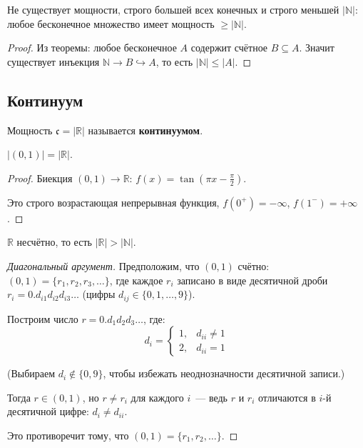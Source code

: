 \documentclass[12pt]{article}
\begin{document}
	\begin{corollary}
		Не существует мощности, строго большей всех конечных и строго меньшей $|\mathbb{N}|$: любое бесконечное множество имеет мощность $\geqslant |\mathbb{N}|$.
	\end{corollary}
	
	\begin{proof}
		Из теоремы: любое бесконечное $A$ содержит счётное $B \subseteq A$. Значит существует инъекция $\mathbb{N} \to B \hookrightarrow A$, то есть $|\mathbb{N}| \leqslant |A|$.
	\end{proof}
	
	\subsection{Континуум}
	
	\begin{definition}
		Мощность $\mathfrak{c} = |\mathbb{R}|$ называется \textbf{континуумом}.
	\end{definition}
	
	\begin{theorem}
		$|(0, 1)| = |\mathbb{R}|$.
	\end{theorem}
	
	\begin{proof}
		Биекция $(0, 1) \to \mathbb{R}$: $f(x) = \tan\!\left(\pi x - \frac{\pi}{2}\right)$.
		
		Это строго возрастающая непрерывная функция, $f(0^+) = -\infty$, $f(1^-) = +\infty$.
	\end{proof}
	
	\begin{theorem}[Кантор]
		$\mathbb{R}$ несчётно, то есть $|\mathbb{R}| > |\mathbb{N}|$.
	\end{theorem}
	
	\begin{proof}[Диагональный аргумент]
		Предположим, что $(0, 1)$ счётно: $(0, 1) = \{r_1, r_2, r_3, \dots\}$, где каждое $r_i$ записано в виде десятичной дроби $r_i = 0.d_{i1}d_{i2}d_{i3}\dots$ (цифры $d_{ij} \in \{0, 1, \dots, 9\}$).
		
		Построим число $r = 0.d_1d_2d_3\dots$, где:
		\[d_i = \begin{cases} 1, & d_{ii} \neq 1 \\ 2, & d_{ii} = 1 \end{cases}\]
		
		(Выбираем $d_i \notin \{0, 9\}$, чтобы избежать неоднозначности десятичной записи.)
		
		Тогда $r \in (0, 1)$, но $r \neq r_i$ для каждого $i$~--- ведь $r$ и $r_i$ отличаются в $i$-й десятичной цифре: $d_i \neq d_{ii}$.
		
		Это противоречит тому, что $(0, 1) = \{r_1, r_2, \dots\}$.
	\end{proof}
	
\end{document}
